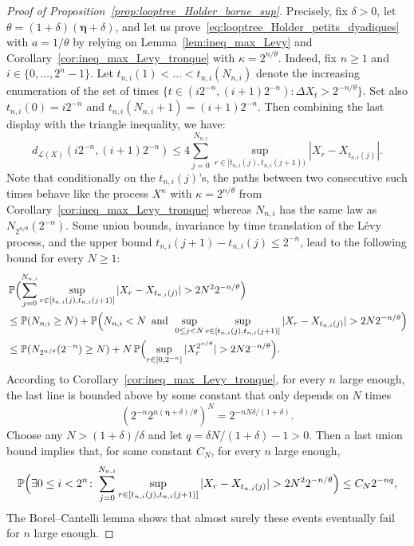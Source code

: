 \documentclass[british, a4paper,11pt]{article}
\numberwithin{equation}{section}
\theoremstyle{definition}
\renewcommand{\P}{\mathop{}\!\mathbb{P}}
\newcommand{\Loop}{\mathscr{L}}
\newcommand{\bdeta}{\boldsymbol{\eta}}
\begin{document}
\begin{proof}[Proof of Proposition~\ref{prop:looptree_Holder_borne_sup}]
Precisely, fix $\delta>0$, let $\theta = (1+\delta) (\bdeta+\delta)$, and let us prove~\eqref{eq:looptree_Holder_petits_dyadiques} with $a = 1/\theta$ by relying on Lemma~\ref{lem:ineq_max_Levy} and Corollary~\ref{cor:ineq_max_Levy_tronque} with $\kappa = 2^{n/\theta}$.
Indeed, fix $n \geq 1$ and $i \in \{0, \dots, 2^{n}-1\}$. 
Let $t_{n,i}(1) < \dots < t_{n,i}(N_{n,i})$ denote the increasing enumeration of the set of times $\{t \in (i 2^{-n}, (i+1) 2^{-n}) \colon \Delta X_{t} > 2^{-n/\theta}\}$. Set also $t_{n,i}(0) = i 2^{-n}$ and 
$t_{n,i}(N_{n,i}+1) = (i+1) 2^{-n}$.
Then combining the last display with the triangle inequality, we have:
\begin{equation}\label{eq:borne_looptre_par_la_droite}
d_{\Loop(X)}(i 2^{-n}, (i+1) 2^{-n}) 
\leq 4 \sum_{j=0}^{N_{n,i}} \sup_{r \in [t_{n,i}(j), t_{n,i}(j+1))} |X_r - X_{t_{n,i}(j)}|
.\end{equation}
Note that conditionally on the $t_{n,i}(j)$'s, the paths between two consecutive such times behave like the process $X^\kappa$ with $\kappa = 2^{n/\theta}$ from Corollary~\ref{cor:ineq_max_Levy_tronque} whereas $N_{n,i}$ has the same law as $N_{2^{n/\theta}}(2^{-n})$.
Some union bounds, invariance by time translation of the L\'evy process, and the upper bound $t_{n,i}(j+1)-t_{n,i}(j) \le 2^{-n}$, lead to the following bound for every $N\ge1$:
\begin{align*}
&\P\Bigl(\sum_{j=0}^{N_{n,i}} \sup_{r \in [t_{n,i}(j), t_{n,i}(j+1)]} |X_{r}-X_{t_{n,i}(j)}| > 2 N^2 2^{-n/\theta}\Bigr)
\\
&\le \P(N_{n,i} \geq N) + \P\Bigl(N_{n,i} < N \enskip\text{and}\enskip \sup_{0 \le j < N} \sup_{r \in [t_{n,i}(j), t_{n,i}(j+1)]} |X_{r}-X_{t_{n,i}(j)}| > 2 N 2^{-n/\theta}\Bigr)
\\
&\le \P(N_{2^{n/\theta}}(2^{-n}) \geq N) + N \P\Bigl(\sup_{r \in [0, 2^{-n}]} |X^{2^{n/\theta}}_{r}| > 2 N 2^{-n/\theta}\Bigr)
.\end{align*}
According to Corollary~\ref{cor:ineq_max_Levy_tronque}, for every $n$ large enough, the last line is bounded above by some constant that only depends on $N$ times
\[(2^{-n} 2^{n (\bdeta+\delta)/\theta})^N
= 2^{-nN \delta / (1+\delta)}
.\]
Choose any $N > (1+\delta)/\delta$ and let $q = \delta N / (1+\delta) - 1 > 0$.
Then a last union bound implies that, for some constant $C_N$, for every $n$ large enough,
\[\P\Bigl(\exists 0 \le i < 2^n \colon \sum_{j=0}^{N_{n,i}} \sup_{r \in [t_{n,i}(j), t_{n,i}(j+1)]} |X_{r}-X_{t_{n,i}(j)}| > 2 N^2 2^{-n/\theta}\Bigr)
\leq C_N 2^{-n q}
,\]
The Borel--Cantelli lemma shows that almost surely these events eventually fail for $n$ large enough. 


\end{proof}
\end{document}
